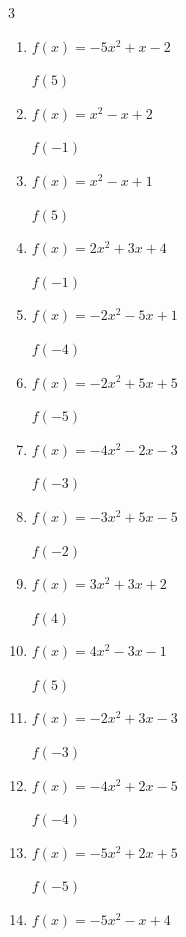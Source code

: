 \begin{multicols}{3}
\begin{enumerate}
$f(-1)$
        \phantom{$= 6$}

  \item $f(x)=-5x^{2}+x-2$

$f(5)$
        \phantom{$= -122$}

  \item $f(x)=x^{2}-x+2$

$f(-1)$
        \phantom{$= 4$}

  \item $f(x)=x^{2}-x+1$

$f(5)$
        \phantom{$= 21$}

  \item $f(x)=2x^{2}+3x+4$

$f(-1)$
        \phantom{$= 3$}

  \item $f(x)=-2x^{2}-5x+1$

$f(-4)$
        \phantom{$= -11$}

  \item $f(x)=-2x^{2}+5x+5$

$f(-5)$
        \phantom{$= -70$}

  \item $f(x)=-4x^{2}-2x-3$

$f(-3)$
        \phantom{$= -33$}

  \item $f(x)=-3x^{2}+5x-5$

$f(-2)$
        \phantom{$= -27$}

  \item $f(x)=3x^{2}+3x+2$

$f(4)$
        \phantom{$= 62$}

  \item $f(x)=4x^{2}-3x-1$

$f(5)$
        \phantom{$= 84$}

  \item $f(x)=-2x^{2}+3x-3$

$f(-3)$
        \phantom{$= -30$}

  \item $f(x)=-4x^{2}+2x-5$

$f(-4)$
        \phantom{$= -77$}

\columnbreak %

  \item $f(x)=-5x^{2}+2x+5$

$f(-5)$
        \phantom{$= -130$}

  \item $f(x)=-5x^{2}-x+4$


\end{enumerate}
\end{multicols}
